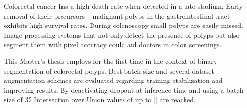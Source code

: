 Colorectal cancer has a high death rate when detected in a late stadium.
Early removal of their precursors -- malignant polyps in the gastrointestinal tract -- exhibits high survival rates.
During colonoscopy small polyps are easily missed.
Image processing systems that not only detect the presence of polyps but also segment them with pixel accuracy could aid doctors in colon screenings.

This Master's thesis employs  for the first time in the context of binary segmentation of colorectal polyps.
Best batch size and several dataset augmentation schemes are evaluated regarding training stabilization and improving results.
By deactivating dropout at inference time and using a batch size of 32 Intersection over Union values of up to [] are reached.
